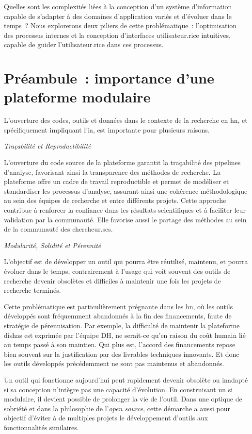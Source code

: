 \documentclass[a4paper,12pt,twoside]{book}
\newcommand{\dishas}{\gls{dishas}\xspace}
\newcommand{\ia}{\gls{ia}\xspace}
\newcommand{\hn}{\gls{hn}\xspace}
\newcommand{\si}{\gls{si}\xspace}
\newcommand{\clearemptydoublepage}{\newpage{\pagestyle{empty}\cleardoublepage}}
\newcommand\chapterNo[1]{%
 \chapter*{#1}
  \markboth{}{} %
  \markright{\MakeUppercase{#1}}
}
\begin{document}
Quelles sont les complexités liées à la conception d'un système
d'information capable de s'adapter à des domaines d'application variés
et d'évoluer dans le temps~? Nous explorerons deux piliers de cette
problématique~: l'optimisation des processus internes et la conception
d'interfaces utilisateur.rice intuitives, capable de guider l'utilisateur.rice
dans ces processus.

\clearemptydoublepage

\hypertarget{preambule}{%
\chapterNo{Préambule~: importance d'une plateforme modulaire}\label{preambule}}
        
      L'ouverture des codes, outils et données dans le contexte de la
recherche en \hn, et spécifiquement impliquant l'\ia, est
importante pour plusieurs raisons.

\emph{Traçabilité et Reproductibilité}

L'ouverture du code source de la plateforme garantit la traçabilité des
pipelines d'analyse, favorisant ainsi la transparence des méthodes de
recherche. La plateforme offre un cadre de travail reproductible et
permet de modéliser et standardiser les processus d'analyse, assurant
ainsi une cohérence méthodologique au sein des équipes de recherche et
entre différents projets. Cette approche contribue à renforcer la
confiance dans les résultats scientifiques et à faciliter leur
validation par la communauté. Elle favorise aussi le partage des méthodes au sein de la communauté des chercheur.ses. 

\emph{Modularité, Solidité et Pérennité}

L'objectif est de développer un outil qui pourra être réutilisé,
maintenu, et pourra évoluer dans le temps, contrairement à l'usage
qui voit souvent des outils de recherche devenir obsolètes et difficiles
à maintenir une fois les projets de recherche terminés.

Cette problématique est particulièrement prégnante dans les \hn, où les outils développés sont fréquemment abandonnés à la
fin des financements, faute de stratégie de pérennisation. Par exemple,
la difficulté de maintenir la plateforme \dishas est exprimée par
l'équipe DH, ne serait-ce qu'en raison du coût humain lié au temps passé
à son maintien. Qui plus est, l'accord des financements repose bien
souvent sur la justification par des livrables techniques innovants. Et
donc les outils développés précédemment ne sont pas maintenus et
abandonnés.

Un outil qui fonctionne aujourd'hui peut rapidement devenir obsolète ou
inadapté si sa conception n'intègre pas une capacité d'évolution. En
construisant un \si modulaire, il devient possible de prolonger la vie de
l'outil. Dans une optique de sobriété et dans la philosophie de l'\textit{open source}, cette démarche a aussi pour objectif d'éviter à de multiples
projets le développement d'outils aux fonctionnalités similaires.
\end{document}
